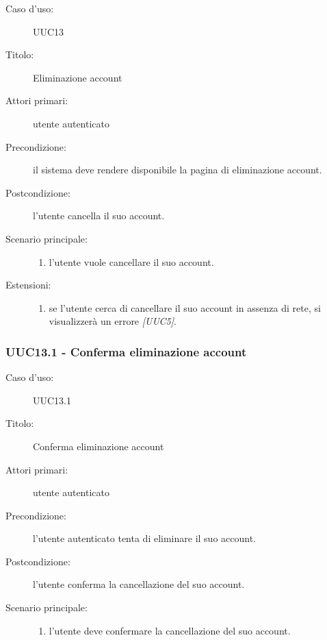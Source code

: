 \documentclass[casi-duso]{subfiles}
\begin{document}
\begin{description}
  \item[Caso d’uso:] UUC13
  \item[Titolo:] Eliminazione account
  \item[Attori primari:] utente autenticato
  \item[Precondizione:] il sistema deve rendere disponibile la pagina di eliminazione account.
  \item[Postcondizione:] l'utente cancella il suo account.
  \item[Scenario principale:]
        \begin{enumerate}
          \item l'utente vuole cancellare il suo account.
        \end{enumerate}
        \item[Estensioni:]
        \begin{enumerate}
          \item se l'utente cerca di cancellare il suo account in assenza di rete, si visualizzerà un errore \emph{[UUC5]}.
        \end{enumerate}
\end{description}

\subsubsection{UUC13.1 - Conferma eliminazione account}%
\label{subsub:UUC13.1utente}

\begin{description}
  \item[Caso d’uso:] UUC13.1
  \item[Titolo:] Conferma eliminazione account
  \item[Attori primari:] utente autenticato
  \item[Precondizione:] l'utente autenticato tenta di eliminare il suo account.
  \item[Postcondizione:] l'utente conferma la cancellazione del suo account.
  \item[Scenario principale:]
        \begin{enumerate}
          \item l'utente deve confermare la cancellazione del suo account.
        \end{enumerate}
\end{description}
\end{document}
